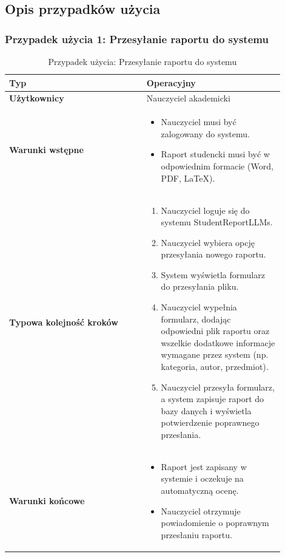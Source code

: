 \documentclass[a4paper, 12pt]{article}
\begin{document}
\subsection{Opis przypadków użycia}

\subsubsection{Przypadek użycia 1: Przesyłanie raportu do systemu}

\begin{table}[H]
\footnotesize
\centering
\caption{Przypadek użycia: Przesyłanie raportu do systemu}
\begin{tabular}{|p{0.45\linewidth}|p{0.45\linewidth}|}
\hline
\textbf{Typ} & Operacyjny \\
\hline
\textbf{Użytkownicy} & Nauczyciel akademicki \\
\hline
\textbf{Warunki wstępne} &
\begin{itemize}
    \item Nauczyciel musi być zalogowany do systemu.
    \item Raport studencki musi być w odpowiednim formacie (Word, PDF, LaTeX).
\end{itemize} \\
\hline
\textbf{Typowa kolejność kroków} &
\begin{enumerate}
    \item Nauczyciel loguje się do systemu StudentReportLLMs.
    \item Nauczyciel wybiera opcję przesyłania nowego raportu.
    \item System wyświetla formularz do przesyłania pliku.
    \item Nauczyciel wypełnia formularz, dodając odpowiedni plik raportu oraz wszelkie dodatkowe informacje wymagane przez system (np. kategoria, autor, przedmiot).
    \item Nauczyciel przesyła formularz, a system zapisuje raport do bazy danych i wyświetla potwierdzenie poprawnego przesłania.
\end{enumerate} \\
\hline
\textbf{Warunki końcowe} &
\begin{itemize}
    \item Raport jest zapisany w systemie i oczekuje na automatyczną ocenę.
    \item Nauczyciel otrzymuje powiadomienie o poprawnym przesłaniu raportu.
\end{itemize} \\

\end{tabular}
\end{table}
\end{document}
